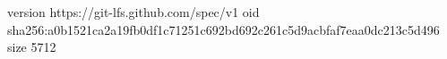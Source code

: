 version https://git-lfs.github.com/spec/v1
oid sha256:a0b1521ca2a19fb0df1c71251c692bd692c261c5d9acbfaf7eaa0dc213c5d496
size 5712
